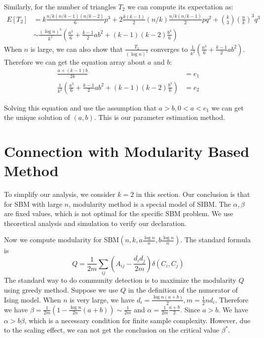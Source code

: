 \documentclass{ctexart}
\begin{document}
	Similarly, for the number of triangles $T_2$ we can compute its expectation as:
	\begin{align}
	E[T_2] &= k \frac{n/k(n/k-1)(n/k-2)}{6}p^3 + 2\frac{k(k-1)}{2}(n/k) \frac{n/k(n/k-1)}{2} pq^2 + \binom{k}{3} \left(\frac{n}{k}\right)^3 q^3 \\
	&\sim \frac{(\log n)^3}{k^2}
	(\frac{a^3}{6} + \frac{k-1}{2}ab^2 + (k-1)(k-2)\frac{b^3}{6})
	\end{align}
	When $n$ is large, we can also show that $\frac{T_2}{(\log n)^3}$ converges to $\frac{1}{k^2}
	(\frac{a^3}{6} + \frac{k-1}{2}ab^2)$. Therefore we can get the equation array about $a$ and $b$:
	\begin{align}
	\frac{a+(k-1)b}{2k} & = e_1 \label{eq:e_1}\\
	\frac{1}{k^2}
	\left(\frac{a^3}{6} + \frac{k-1}{2}ab^2 + (k-1)(k-2)\frac{b^3}{6}\right) & = e_2 \label{eq:e_2}
	\end{align}	
	
	Solving this equation and use the assumption that $ a > b, 0 < a < e_1$ we can get the unique solution of $(a,b)$.
	This is our parameter estimation method.
	\section{Connection with Modularity Based Method}
	To simplify our analysis, we consider $k=2$ in this section. Our conclusion is that for SBM with large $n$, modularity method
	is a special model of SIBM. The $\alpha, \beta$ are fixed values, which is not optimal for the specific SBM problem. We use theoretical
	analysis and simulation to verify our declaration.

	Now we compute modularity for SBM$(n,k, a\frac{\log n}{n}, b\frac{\log n}{n})$.
	The standard formula is
	\begin{equation}
	Q = \frac{1}{2m} \sum_{ij} (A_{ij} - \frac{d_i d_j}{2m}) \delta(C_i, C_j)
	\end{equation}
	The standard way to do community detection is to maximize the modularity $Q$ using greedy method.
	Suppose we use $Q$ in the definition of the numerator of Ising model. When $n$ is very large,
	we have $d_i = \frac{\log n(a+b)}{2}, m = \frac{1}{2}n d_i$. Therefore we have $\beta = \frac{1}{2m}(1-\frac{\log n}{2n}(a+b))
	\sim \frac{1}{2m}$
	and $\alpha = \frac{1}{2m}\frac{a+b}{2}$. Since $a>b$. We have $\alpha > b \beta$, which is a necessary condition for finite sample complexity.
	However, due to the scaling effect, we can not get the conclusion on the critical value $\beta^*$.
	
\end{document}
